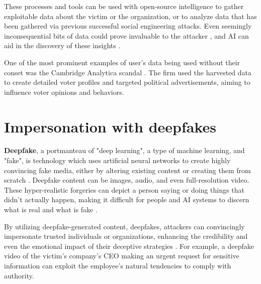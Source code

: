 These processes and tools can be used with open-source intelligence to gather exploitable data about the victim or the organization, or to analyze data that has been gathered via previous successful social engineering attacks. Even seemingly inconsequential bits of data could prove invaluable to the attacker \citep{mitnickArtDeceptionControlling2003}, and AI can aid in the discovery of these insights \citep{blauthArtificialIntelligenceCrime2022}.

One of the most prominent examples of user's data being used without their conset was the Cambridge Analytica scandal \citep{blauthArtificialIntelligenceCrime2022}. The firm used the harvested data to create detailed voter profiles and targeted political advertisements, aiming to influence voter opinions and behaviors.













\section{Impersonation with deepfakes}
\begin{comment}
Deepfake-generated content

What to cover:
    - What is a deepfake
    - Deepfakeja ei käsitely aiemmin? Generative AI kappaleessa?
    - Seuraava section kertoo tietojenkalastelusta ja sitoo chatbotit, automated intelligence gathering ja nää deepfaket yhteen kokonaisuudeksi

\end{comment}

\textbf{Deepfake}, a portmanteau of "deep learning", a type of machine learning, and "fake", is technology which uses artificial neural networks to create highly convincing fake media, either by altering existing content or creating them from scratch \citep{mirskyTheCreationAndDetectionOfDeepfakes2021}. Deepfake content can be images, audio, and even full-resolution video. These hyper-realistic forgeries can depict a person saying or doing things that didn't actually happen, making it difficult for people and AI systems to discern what is real and what is fake \citep{blauthArtificialIntelligenceCrime2022}.

By utilizing deepfake-generated content, deepfakes, attackers can convincingly impersonate trusted individuals or organizations, enhancing the credibility and even the emotional impact of their deceptive strategies \citep{mirskyTheCreationAndDetectionOfDeepfakes2021}. For example, a deepfake video of the victim's company's CEO making an urgent request for sensitive information can exploit the employee's natural tendencies to comply with authority.

